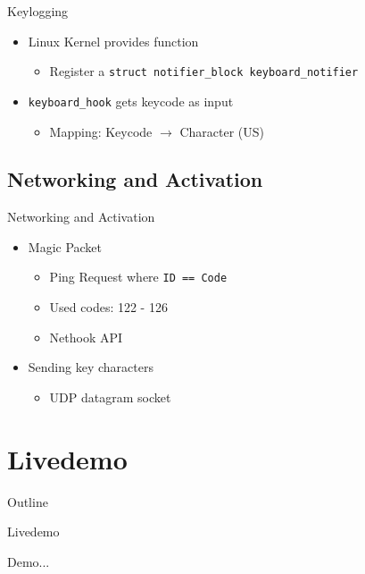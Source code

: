 \documentclass[]{beamer}
\begin{document}
\begin{frame}[t]{Keylogging}
  \begin{itemize}
    \item Linux Kernel provides function
    \begin{itemize}
      \item Register a \lstinline{struct notifier_block keyboard_notifier}
    \end{itemize}
    \item \lstinline{keyboard_hook} gets keycode as input
    \begin{itemize}
      \item Mapping: Keycode $\rightarrow$ Character (US)
    \end{itemize}
  \end{itemize}
  
\end{frame}



\subsection{Networking and Activation}

\begin{frame}[t]{Networking and Activation}
  \begin{itemize}
    \item Magic Packet
    \begin{itemize}
      \item Ping Request where \lstinline{ID == Code}
      \item Used codes: 122 - 126
      \item Nethook API
    \end{itemize}
    \item Sending key characters
    \begin{itemize}
      \item UDP datagram socket
    \end{itemize}
  \end{itemize}
\end{frame}


\section{Livedemo}
\begin{frame}[t]{Outline}
  \tableofcontents[currentsection]
\end{frame}

\begin{frame}[t]{Livedemo}
   \begin{center} \LARGE{Demo...} \end{center}
\end{frame}
\end{document}
